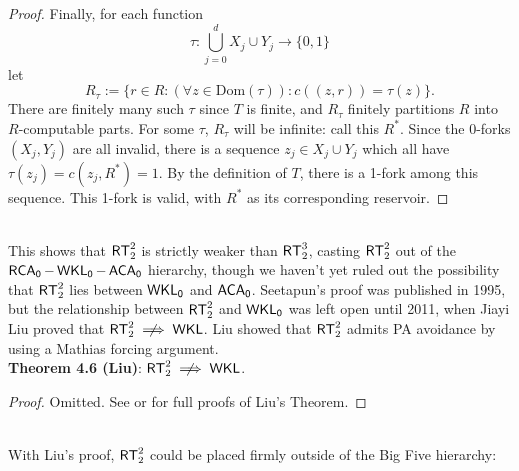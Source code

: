 \documentclass{amsart}
\begin{document}
\begin{proof}
		Finally, for each function
		$$
		\tau : \bigcup_{j=0}^d X_j\cup Y_j \to \{0,1\}
		$$
		let
		$$
		R_{\tau} := \{r\in R : (\forall z\in \textrm{Dom}(\tau)): c((z,r)) = \tau(z) \}.
		$$ 
		There are finitely many such $\tau$ since $T$ is finite, and $R_{\tau}$ finitely partitions $R$ into $R$-computable parts. For some $\tau$, $R_{\tau}$ will be infinite: call this $R^*$. Since the $0$-forks $(X_j,Y_j)$ are all invalid, there is a sequence $z_j\in X_j\cup Y_j$ which all have $\tau(z_j) = c(z_j,R^*)=1$. By the definition of $T$, there is a 1-fork among this sequence. This 1-fork is valid, with $R^*$ as its corresponding reservoir.
	\end{proof}\\
	
	This shows that $\operatorname{\sf{RT}}^2_2$ is strictly weaker than $\operatorname{\sf{RT}}^3_2$, casting $\operatorname{\sf{RT}}^2_2$ out of the $\operatorname{\sf{RCA_0}}-\operatorname{\sf{WKL_0}}-\operatorname{\sf{ACA_0}}$ hierarchy, though we haven't yet ruled out the possibility that $\operatorname{\sf{RT}}^2_2$ lies between $\operatorname{\sf{WKL_0}}$ and $\operatorname{\sf{ACA_0}}$. Seetapun's proof was published in 1995, but the relationship between $\operatorname{\sf{RT}}^2_2$ and $\operatorname{\sf{WKL_0}}$ was left open until 2011, when Jiayi Liu proved that $\RT^2_2\centernot\implies \sf{WKL}$. Liu showed that $\operatorname{\sf{RT}}^2_2$ admits PA avoidance by using a Mathias forcing argument.\\
	
	\noindent \textbf{Theorem 4.6 (Liu)}: $\RT^2_2\centernot \implies \sf{WKL}$.
	\begin{proof}
		Omitted. See \cite{dm} or \cite{hirschfeldt} for full proofs of Liu's Theorem.
	\end{proof}\\
	
	With Liu's proof, $\operatorname{\sf{RT}}^2_2$ could be placed firmly outside of the Big Five hierarchy:
	
\end{document}
